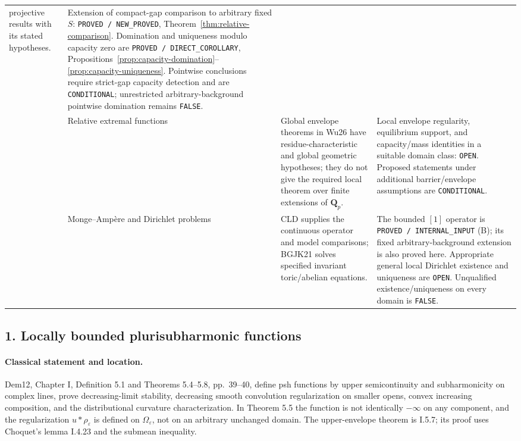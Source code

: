 \documentclass[11pt,a4paper]{article}
\numberwithin{equation}{section}
\theoremstyle{definition}
\theoremstyle{remark}
\begin{document}
\begin{longtable}{@{}>{\raggedright\arraybackslash}p{}>{\raggedright\arraybackslash}p{}>{\raggedright\arraybackslash}p{}>{\raggedright\arraybackslash}p{}@{}}
projective results with its stated hypotheses. &
Extension of compact-gap comparison to arbitrary fixed \(S\):
\texttt{PROVED / NEW\_PROVED}, Theorem~\ref{thm:relative-comparison}.
Domination and uniqueness modulo capacity zero are
\texttt{PROVED / DIRECT\_COROLLARY},
Propositions~\ref{prop:capacity-domination}--\ref{prop:capacity-uniqueness}.
Pointwise conclusions require strict-gap capacity detection and are
\texttt{CONDITIONAL}; unrestricted arbitrary-background pointwise
domination remains \texttt{FALSE}.\\[3pt]
10 & Relative extremal functions &
Global envelope theorems in Wu26 have residue-characteristic and global
geometric hypotheses; they do not give the required local theorem over
finite extensions of \(\mathbf Q_p\). &
Local envelope regularity, equilibrium support, and capacity/mass
identities in a suitable domain class: \texttt{OPEN}. Proposed statements
under additional barrier/envelope assumptions are \texttt{CONDITIONAL}.\\[3pt]
11 & Monge--Amp\`ere and Dirichlet problems &
CLD supplies the continuous operator and model comparisons; BGJK21 solves
specified invariant toric/abelian equations. &
The bounded \([1]\) operator is \texttt{PROVED / INTERNAL\_INPUT} (B);
its fixed arbitrary-background extension is also proved here. Appropriate general local
Dirichlet existence and uniqueness are \texttt{OPEN}. Unqualified
existence/uniqueness on every domain is \texttt{FALSE}.\\
\hline
\end{longtable}

\subsection{1. Locally bounded plurisubharmonic functions}

\paragraph{Classical statement and location.}
Dem12, Chapter I, Definition 5.1 and Theorems 5.4--5.8, pp.~39--40,
define psh functions by upper semicontinuity and subharmonicity on complex
lines, prove decreasing-limit stability, decreasing smooth convolution
regularization on smaller opens, convex increasing composition, and the
distributional curvature characterization. In Theorem 5.5 the function is
not identically \(-\infty\) on any component, and the regularization
\(u*\rho_\varepsilon\) is defined on \(\Omega_\varepsilon\), not on an
arbitrary unchanged domain. The upper-envelope theorem is I.5.7; its
proof uses Choquet's lemma I.4.23 and the submean inequality.
\cite[Ch.~I, pp.~39--40]{Dem12}
\end{document}
